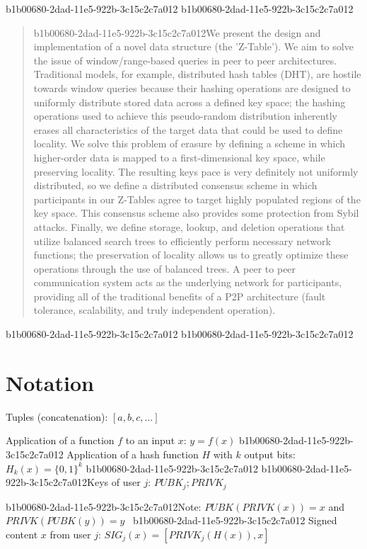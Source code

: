 \documentclass[12pt]{article}
\begin{document}
\maketitle
b1b00680-2dad-11e5-922b-3c15c2c7a012
b1b00680-2dad-11e5-922b-3c15c2c7a012\begin{abstract}
b1b00680-2dad-11e5-922b-3c15c2c7a012We present the design and implementation of a novel data structure (the 'Z-Table'). We aim to solve the issue of window/range-based queries in peer to peer architectures. Traditional models, for example,  distributed hash tables (DHT), are hostile towards window queries because their hashing operations are designed to uniformly distribute stored data across a defined key space; the hashing operations used to achieve this pseudo-random distribution inherently erases all characteristics of the target data that could be used to define locality. We solve this problem of erasure by defining a scheme in which higher-order data is mapped to a first-dimensional key space, while preserving locality. The resulting keys pace is very definitely not uniformly distributed, so we define a distributed consensus scheme in which participants in our Z-Tables agree to target highly populated regions of the key space. This consensus scheme also provides some protection from Sybil attacks. Finally, we define storage, lookup, and deletion operations that utilize balanced search trees to efficiently perform necessary network functions; the preservation of locality allows us to greatly optimize these operations through the use of balanced trees. A peer to peer communication system acts as the underlying network for participants, providing all of the traditional benefits of a P2P architecture (fault tolerance, scalability, and truly independent operation).
\end{abstract}
b1b00680-2dad-11e5-922b-3c15c2c7a012
b1b00680-2dad-11e5-922b-3c15c2c7a012\section{Notation}

Tuples (concatenation): $[a,b,c,...]$

Application of a function $f$ to an input $x$: $y=f(x)$
b1b00680-2dad-11e5-922b-3c15c2c7a012
Application of a hash function $H$ with $k$ output bits: $H_{k}(x) = \{0,1\}^k$
b1b00680-2dad-11e5-922b-3c15c2c7a012
b1b00680-2dad-11e5-922b-3c15c2c7a012Keys of user $j$: $ PUBK_j; PRIVK_j $

b1b00680-2dad-11e5-922b-3c15c2c7a012Note: $PUBK(PRIVK(x)) = x$ and $PRIVK(PUBK(y)) = y$~
b1b00680-2dad-11e5-922b-3c15c2c7a012
Signed content $x$ from user $j$: $SIG_j(x) = \left[ PRIVK_j( H(x) ), x \right]$
\end{document}
